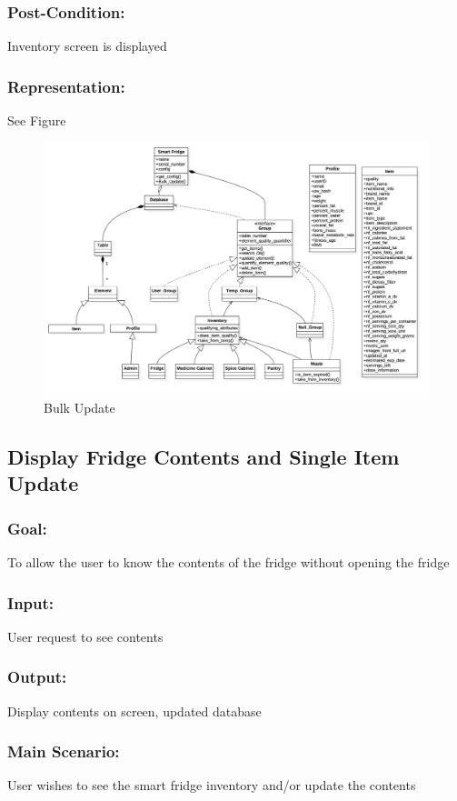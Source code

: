 		\subsubsection{Post-Condition:} Inventory screen is displayed
		\subsubsection{Representation:} See Figure~\thesubsection
		\begin{figure}[p]
			\centering
			\includegraphics[width=\textwidth]{bulkupdate.png}
			\caption{Bulk Update}
		\end{figure}
	
	\subsection{Display Fridge Contents and Single Item Update}
		\subsubsection{Goal:} To allow the user to know the contents of the fridge without opening the fridge
		\subsubsection{Input:} User request to see contents
		\subsubsection{Output:} Display contents on screen, updated database
		\subsubsection{Main Scenario:} User wishes to see the smart fridge inventory and/or update the contents 
